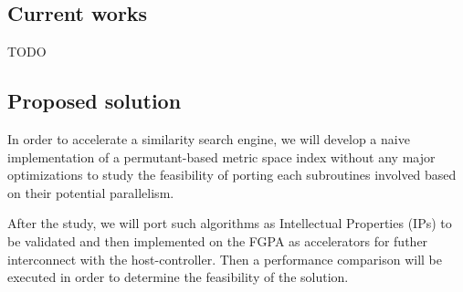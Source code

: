 \documentclass[11pt,letterpaper]{article}
\begin{document}
\subsection{Current works} 
TODO
\subsection{Proposed solution}
    In order to accelerate a similarity search engine, we will develop a naive implementation of a 
    permutant-based metric space index without any major optimizations to study the feasibility of porting
    each subroutines involved based on their potential parallelism.

    After the study, we will port such algorithms as Intellectual Properties (IPs) to be validated and
    then implemented on the FGPA as accelerators for futher interconnect with the host-controller. Then a
    performance comparison will be executed in order to determine the feasibility of the solution.

    

\end{document}
